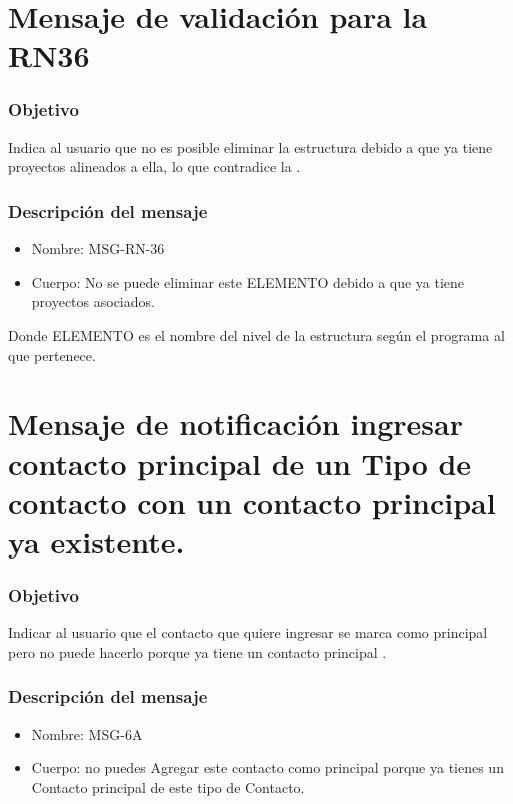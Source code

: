 \section{Mensaje de validación para la RN36} \label{MSG_RN36}

\subsubsection{Objetivo}
Indica al usuario que no es posible eliminar la estructura debido a que ya tiene proyectos alineados a ella, lo que contradice la .

\subsubsection{Descripción del mensaje}
\begin{itemize}
\item Nombre: MSG-RN-36
\item Cuerpo: No se puede eliminar este ELEMENTO debido a que ya tiene proyectos asociados.
\end{itemize}
Donde ELEMENTO es el nombre del nivel de la estructura según el programa al que pertenece.

\section{Mensaje de notificación ingresar contacto principal de un Tipo de contacto con un contacto principal ya existente.}\label{MSG6A}

\subsubsection{Objetivo}
Indicar al usuario que el contacto que quiere ingresar se marca como principal pero no puede hacerlo porque ya tiene un contacto principal .

\subsubsection{Descripción del mensaje}
\begin{itemize}
\item Nombre: MSG-6A
\item Cuerpo: no puedes Agregar este contacto como principal porque ya tienes un Contacto principal de este tipo de Contacto.

\end{itemize}

